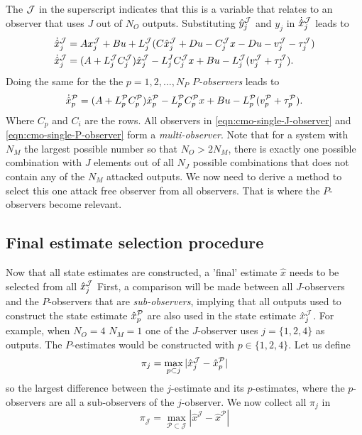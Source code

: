 The $\mathcal{J}$ in the superscript indicates that this is a variable that relates to an observer that uses $J$ out of $N_O$ outputs.
Substituting $\hat{y}_j^{\mathcal{J}}$ and $y_j$ in $\dot{\hat{x}}_j^{\mathcal{J}}$ leads to
\begin{equation}\label{eqn:cmo-single-J-observer}
    \begin{split}
        \dot{\hat{x}}_j^{\mathcal{J}} &= Ax_j^{\mathcal{J}} + Bu + L_j^{\mathcal{J}}(C\hat{x}_j^{\mathcal{J}} + Du - C_j^{\mathcal{J}}x - Du - v_j^{\mathcal{J}} - \tau^{\mathcal{J}}_j) \\
        \dot{\hat{x}}_j^{\mathcal{J}} &= (A + L_j^{\mathcal{J}}C_j^{\mathcal{J}})\hat{x}^{\mathcal{J}}_j - L_j^JC_j^{\mathcal{J}}x + Bu - L_j^{\mathcal{J}}(v_j^{\mathcal{J}} + \tau_j^{\mathcal{J}}). \\
    \end{split}    
\end{equation}
Doing the same for the the $p=1,2,\dots,N_P$ $P$\textit{-observers} leads to
\begin{equation}\label{eqn:cmo-single-P-observer}
    \dot{\hat{x}}_p^{\mathcal{P}} = (A + L_p^{\mathcal{P}}C_p^{\mathcal{P}})\hat{x}_p^{\mathcal{P}} - L_p^{\mathcal{P}}C_p^{\mathcal{P}}x + Bu - L_p^{\mathcal{P}}(v_p^{\mathcal{P}} + \tau_p^{\mathcal{P}}).
\end{equation}
Where $C_p$ and $C_i$ are the rows. All observers in \eqref{eqn:cmo-single-J-observer} and \eqref{eqn:cmo-single-P-observer} form a \textit{multi-observer}. Note that for a system with $N_M$ the largest possible number so that $N_O > 2N_M$, there is exactly one possible combination with $J$ elements out of all $N_J$ possible combinations that does not contain any of the $N_M$ attacked outputs. We now need to derive a method to select this one attack free observer from all observers. That is where the $P$-observers become relevant.

\subsection{Final estimate selection procedure}
\label{subsec:estimate-selection}
Now that all state estimates are constructed, a 'final' estimate $\hat{x}$ needs to be selected from all $\hat{x}_j^{\mathcal{J}}$ First, a comparison will be made between all $J$-observers and the $P$-observers that are \textit{sub-observers}, implying that all outputs used to construct the state estimate $\hat{x}_p^{\mathcal{P}}$ are also used in the state estimate $\hat{x}_j^{\mathcal{J}}$. For example, when $N_O=4$ $N_M=1$ one of the $J$-observer uses $j=\{1,2,4\}$ as outputs. The $P$-estimates would be constructed with $p \in \{1,2,4\}$. Let us define 
\begin{equation*}
   \pi_{j} = \max_{p \subset j} |\hat{x}^{\mathcal{J}}_{j} - \hat{x}^{\mathcal{P}}_{p}|
\end{equation*}
so the largest difference between the $j$-estimate and its $p$-estimates, where the $p$-observers are all a sub-observers of the $j$-observer. We now collect all $\pi_j$ in
\begin{equation*}
   \pi_{\mathcal{J}} = \max_{\mathcal{P} \subset \mathcal{J}} |\hat{x}^{\mathcal{J}} - \hat{x}^{\mathcal{P}}|
\end{equation*}

